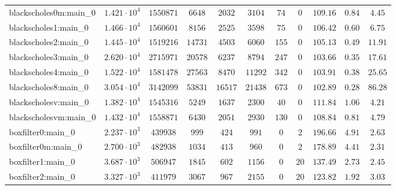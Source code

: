 \begin{tabular}{|l|c|c|c|c|c|c|c|c|c|c|}
blackscholes0m:main\_0         & $ 1.421 \cdot 10^{4} $ & $ 1550871  $ & $ 6648   $ & $ 2032   $ & $ 3104   $ & $ 74   $ & $ 0    $ & $ 109.16      $ & $ 0.84    $ & $ 4.45    $ \\
blackscholes1:main\_0          & $ 1.466 \cdot 10^{4} $ & $ 1560601  $ & $ 8156   $ & $ 2525   $ & $ 3598   $ & $ 75   $ & $ 0    $ & $ 106.42      $ & $ 0.60    $ & $ 6.75    $ \\
blackscholes2:main\_0          & $ 1.445 \cdot 10^{4} $ & $ 1519216  $ & $ 14731  $ & $ 4503   $ & $ 6060   $ & $ 155  $ & $ 0    $ & $ 105.13      $ & $ 0.49    $ & $ 11.91   $ \\
blackscholes3:main\_0          & $ 2.620 \cdot 10^{4} $ & $ 2715971  $ & $ 20578  $ & $ 6237   $ & $ 8794   $ & $ 247  $ & $ 0    $ & $ 103.66      $ & $ 0.35    $ & $ 17.61   $ \\
blackscholes4:main\_0          & $ 1.522 \cdot 10^{4} $ & $ 1581478  $ & $ 27563  $ & $ 8470   $ & $ 11292  $ & $ 342  $ & $ 0    $ & $ 103.91      $ & $ 0.38    $ & $ 25.65   $ \\
blackscholes8:main\_0          & $ 3.054 \cdot 10^{4} $ & $ 3142099  $ & $ 53831  $ & $ 16517  $ & $ 21438  $ & $ 673  $ & $ 0    $ & $ 102.89      $ & $ 0.28    $ & $ 86.28   $ \\
blackscholesv:main\_0          & $ 1.382 \cdot 10^{4} $ & $ 1545316  $ & $ 5249   $ & $ 1637   $ & $ 2300   $ & $ 40   $ & $ 0    $ & $ 111.84      $ & $ 1.06    $ & $ 4.21    $ \\
blackscholesvm:main\_0         & $ 1.432 \cdot 10^{4} $ & $ 1558871  $ & $ 6430   $ & $ 2051   $ & $ 2930   $ & $ 130  $ & $ 0    $ & $ 108.84      $ & $ 0.81    $ & $ 4.79    $ \\
boxfilter0:main\_0             & $ 2.237 \cdot 10^{3} $ & $ 439938   $ & $ 999    $ & $ 424    $ & $ 991    $ & $ 0    $ & $ 2    $ & $ 196.66      $ & $ 4.91    $ & $ 2.63    $ \\
boxfilter0m:main\_0            & $ 2.700 \cdot 10^{3} $ & $ 482938   $ & $ 1034   $ & $ 413    $ & $ 960    $ & $ 0    $ & $ 2    $ & $ 178.89      $ & $ 4.41    $ & $ 2.31    $ \\
boxfilter1:main\_0             & $ 3.687 \cdot 10^{3} $ & $ 506947   $ & $ 1845   $ & $ 602    $ & $ 1156   $ & $ 0    $ & $ 20   $ & $ 137.49      $ & $ 2.73    $ & $ 2.45    $ \\
boxfilter2:main\_0             & $ 3.327 \cdot 10^{3} $ & $ 411979   $ & $ 3067   $ & $ 967    $ & $ 2155   $ & $ 0    $ & $ 20   $ & $ 123.82      $ & $ 1.92    $ & $ 3.03    $ \\

\end{tabular}
